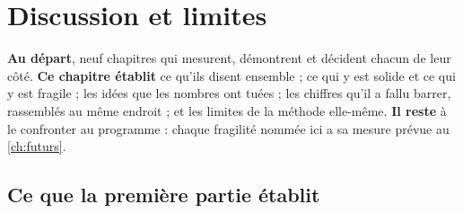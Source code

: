 \chapter{Discussion et limites}\label{ch:discussion}

\begin{origine}
\textbf{Au départ}, neuf chapitres qui mesurent, démontrent et décident chacun de leur côté.
\textbf{Ce chapitre établit} ce qu'ils disent ensemble ; ce qui y est solide et ce qui y est fragile ; les idées que les nombres ont tuées ; les chiffres qu'il a fallu barrer, rassemblés au même endroit ; et les limites de la méthode elle-même.
\textbf{Il reste} à le confronter au programme : chaque fragilité nommée ici a sa mesure prévue au \cref{ch:futurs}.
\end{origine}

\section{Ce que la première partie établit}\label{sec:bilan}

